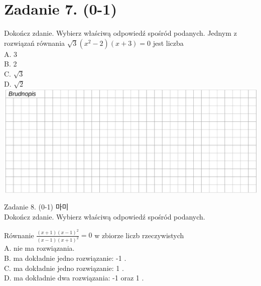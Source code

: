 \documentclass[10pt]{article}
\begin{document}
\section*{Zadanie 7. (0-1)}
Dokończ zdanie. Wybierz właściwą odpowiedź spośród podanych. Jednym z rozwiązań równania \(\sqrt{3}\left(x^{2}-2\right)(x+3)=0\) jest liczba\\
A. 3\\
B. 2\\
C. \(\sqrt{3}\)\\
D. \(\sqrt{2}\)\\
\includegraphics[max width=\textwidth, center]{2024_11_21_51cb67544fb9b029f01cg-07}

Zadanie 8. (0-1) 마미\\
Dokończ zdanie. Wybierz właściwą odpowiedź spośród podanych.

Równanie \(\frac{(x+1)(x-1)^{2}}{(x-1)(x+1)^{2}}=0\) w zbiorze liczb rzeczywistych\\
A. nie ma rozwiązania.\\
B. ma dokładnie jedno rozwiązanie: -1 .\\
C. ma dokładnie jedno rozwiązanie: 1 .\\
D. ma dokładnie dwa rozwiązania: -1 oraz 1 .
\end{document}
